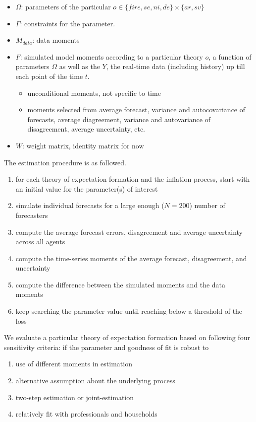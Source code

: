 \documentclass[12pt]{article}
\begin{document}
	\begin{itemize}
		\item  $\Omega$: parameters of the particular $o \in \{{fire}, {se}, {ni},{de} \} \times \{ar, sv\}$
		\item  $\Gamma$: constraints for the parameter. 
		\item $M_{data}$: data moments
		\item $F$: simulated model moments according to a particular theory $o$, a function of parameters $\Omega$ as well as the $Y$, the real-time data (including history) up till each point of the time $t$. 
		\begin{itemize}
			\item unconditional moments, not specific to time
			\item moments selected from average forecast, variance and autocovariance of forecasts, average diagreement, variance and autovariance of disagreement, average uncertainty, etc. 
		\end{itemize}
		\item  $W$: weight matrix, identity matrix for now 
	\end{itemize}

The estimation procedure is as followed. 

	\begin{enumerate}
	\item for each theory of expectation formation and the inflation process, start with an initial value for the parameter(s) of interest
	\item simulate individual forecasts for a large enough ($N=200$) number of forecasters
	\item compute the average forecast errors, disagreement and average uncertainty across all agents
	\item compute the time-series moments of the average forecast, disagreement, and uncertainty
	\item compute the difference between the simulated moments and the data moments 
	\item keep searching the parameter value until reaching below a threshold of the loss
\end{enumerate}

We evaluate a particular theory of expectation formation based on following four sensitivity criteria: if the parameter and goodness of fit is robust to 
\begin{enumerate}
	\item use of different moments in estimation
	\item alternative assumption about the underlying process 
	\item two-step estimation or joint-estimation 
	\item relatively fit with professionals and households  
\end{enumerate}
\end{document}
